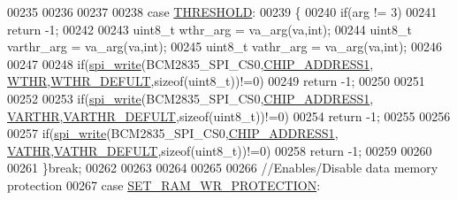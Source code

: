 \begin{DoxyCode}
00235                 
00236                 
00237                 
00238                 \textcolor{keywordflow}{case}  \hyperlink{a00043_a4679d8ea8690999a6c6c7c0cb245c879}{THRESHOLD}:
00239                 \{
00240                     \textcolor{keywordflow}{if}(arg != 3)
00241                       \textcolor{keywordflow}{return} -1;
00242                                                         
00243                      uint8\_t wthr\_arg = va\_arg(va,\textcolor{keywordtype}{int});
00244                      uint8\_t varthr\_arg = va\_arg(va,\textcolor{keywordtype}{int});
00245                      uint8\_t vathr\_arg = va\_arg(va,\textcolor{keywordtype}{int});
00246                      
00247                      
00248                     \textcolor{keywordflow}{if}(\hyperlink{a00007_ga2770219ad8ad1eda1817c0df934b47d0}{spi\_write}(BCM2835\_SPI\_CS0,\hyperlink{a00037_a94de2b046db6e10257ef4481c0a15eaa}{CHIP\_ADDRESS1},
      \hyperlink{a00036_a60f6494fba59e1f242240d12202f4746}{WTHR},\hyperlink{a00036_a54a78cc890aa0300e82a9de239ebc5a5}{WTHR\_DEFULT},\textcolor{keyword}{sizeof}(uint8\_t))!=0)
00249                       \textcolor{keywordflow}{return} -1;
00250                     
00251                     
00252                     
00253                     \textcolor{keywordflow}{if}(\hyperlink{a00007_ga2770219ad8ad1eda1817c0df934b47d0}{spi\_write}(BCM2835\_SPI\_CS0,\hyperlink{a00037_a94de2b046db6e10257ef4481c0a15eaa}{CHIP\_ADDRESS1},
      \hyperlink{a00036_a37f9d81c6baec7ee49887b6f19ac1996}{VARTHR},\hyperlink{a00036_a105c1723ae41d790579de1a93641abea}{VARTHR\_DEFULT},\textcolor{keyword}{sizeof}(uint8\_t))!=0)
00254                       \textcolor{keywordflow}{return} -1;
00255                     
00256                     
00257                     \textcolor{keywordflow}{if}(\hyperlink{a00007_ga2770219ad8ad1eda1817c0df934b47d0}{spi\_write}(BCM2835\_SPI\_CS0,\hyperlink{a00037_a94de2b046db6e10257ef4481c0a15eaa}{CHIP\_ADDRESS1},
      \hyperlink{a00036_af97b8b6a3a2c63818edbc7f6cdceae23}{VATHR},\hyperlink{a00036_a3ca4a19859a50d3b85939e9b0c145637}{VATHR\_DEFULT},\textcolor{keyword}{sizeof}(uint8\_t))!=0)
00258                        \textcolor{keywordflow}{return} -1;
00259                 
00260                 
00261                 \}\textcolor{keywordflow}{break};
00262                 
00263                 
00264                 
00265                
00266                 \textcolor{comment}{//Enables/Disable data memory protection}
00267                 \textcolor{keywordflow}{case} \hyperlink{a00043_a5b534b9caab512045a6e762f3930a501}{SET\_RAM\_WR\_PROTECTION}:

\end{DoxyCode}
